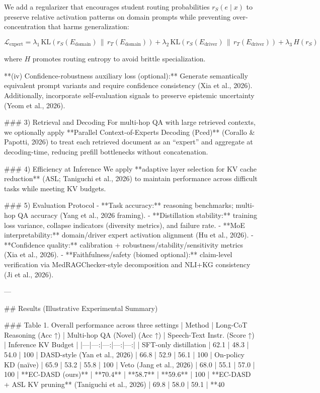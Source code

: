 We add a regularizer that encourages student routing probabilities \(r_S(e \mid x)\) to preserve relative activation patterns on domain prompts while preventing over-concentration that harms generalization:

\[
\mathcal{L}_{\text{expert}} =
\lambda_1 \, \text{KL}(r_S(E_{\text{domain}})\,\|\, r_T(E_{\text{domain}})) +
\lambda_2 \, \text{KL}(r_S(E_{\text{driver}})\,\|\, r_T(E_{\text{driver}})) +
\lambda_3 \, H(r_S)
\]

where \(H\) promotes routing entropy to avoid brittle specialization.

**(iv) Confidence-robustness auxiliary loss (optional):**  
Generate semantically equivalent prompt variants and require confidence consistency (Xia et al., 2026). Additionally, incorporate self-evaluation signals to preserve epistemic uncertainty (Yeom et al., 2026).

### 3) Retrieval and Decoding  
For multi-hop QA with large retrieved contexts, we optionally apply **Parallel Context-of-Experts Decoding (Pced)** (Corallo & Papotti, 2026) to treat each retrieved document as an “expert” and aggregate at decoding-time, reducing prefill bottlenecks without concatenation.

### 4) Efficiency at Inference  
We apply **adaptive layer selection for KV cache reduction** (ASL; Taniguchi et al., 2026) to maintain performance across difficult tasks while meeting KV budgets.

### 5) Evaluation Protocol  
- **Task accuracy:** reasoning benchmarks; multi-hop QA accuracy (Yang et al., 2026 framing).  
- **Distillation stability:** training loss variance, collapse indicators (diversity metrics), and failure rate.  
- **MoE interpretability:** domain/driver expert activation alignment (Hu et al., 2026).  
- **Confidence quality:** calibration + robustness/stability/sensitivity metrics (Xia et al., 2026).  
- **Faithfulness/safety (biomed optional):** claim-level verification via MedRAGChecker-style decomposition and NLI+KG consistency (Ji et al., 2026).

---

## Results (Illustrative Experimental Summary)  

### Table 1. Overall performance across three settings  
| Method | Long-CoT Reasoning (Acc ↑) | Multi-hop QA (Novel) (Acc ↑) | Speech-Text Instr. (Score ↑) | Inference KV Budget |  
|---|---:|---:|---:|---:|
| SFT-only distillation | 62.1 | 48.3 | 54.0 | 100%
| DASD-style (Yan et al., 2026) | 66.8 | 52.9 | 56.1 | 100%
| On-policy KD (naïve) | 65.9 | 53.2 | 55.8 | 100%
| Veto (Jang et al., 2026) | 68.0 | 55.1 | 57.0 | 100%
| **EC-DASD (ours)** | **70.4** | **58.7** | **59.6** | 100%
| **EC-DASD + ASL KV pruning** (Taniguchi et al., 2026) | 69.8 | 58.0 | 59.1 | **40%

